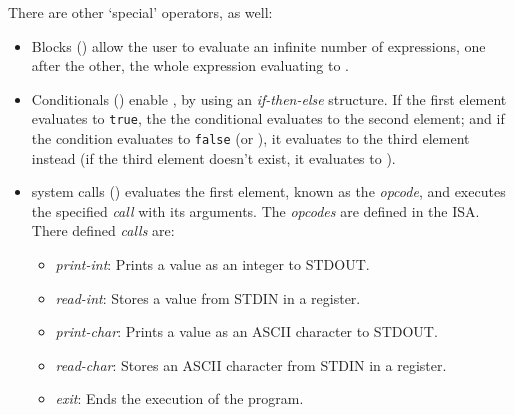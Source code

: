 \noindent
There are other `special' operators, as well:
\begin{itemize}
 \item Blocks () allow the user to evaluate an infinite number of expressions, one after the other, the whole expression evaluating to .
 \item Conditionals () enable , by using an \textit{if-then-else} structure. If the first element evaluates to \texttt{true}, the the conditional evaluates to the second element; and if the condition evaluates to \texttt{false} (or ), it evaluates to the third element instead (if the third element doesn't exist, it evaluates to ).
 \item \Glspl{system call} () evaluates the first element, known as the \textit{opcode}, and executes the specified \textit{call} with its arguments. The \textit{opcodes} are defined in the \gls{ISA}. There defined \textit{calls} are:
 \begin{itemize}[nosep]
    \item \textit{print-int}: Prints a value as an integer to \gls{STDOUT}.
    \item \textit{read-int}: Stores a value from \gls{STDIN} in a \gls{register}.
    \item \textit{print-char}: Prints a value as an ASCII character to \gls{STDOUT}.
    \item \textit{read-char}: Stores an ASCII character from \gls{STDIN} in a \gls{register}.
    \item \textit{exit}: Ends the execution of the program.
  \end{itemize}
\end{itemize}

